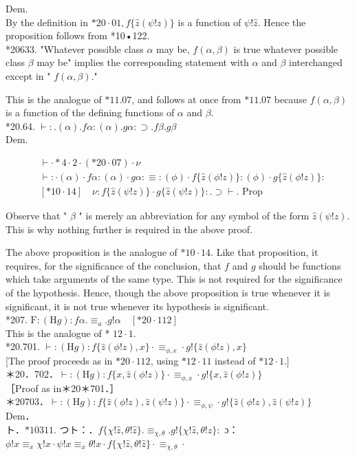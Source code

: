 \documentclass[10pt]{article}
\begin{document}
Dem.\\
By the definition in $* 20 \cdot 01, f\{\hat{z}(\psi!z)\}$ is a function of $\psi!\hat{z}$. Hence the proposition follows from *10•122.\\
*20633. "Whatever possible class $\alpha$ may be, $f(\alpha, \beta)$ is true whatever possible class $\beta$ may be" implies the corresponding statement with $\alpha$ and $\beta$ interchanged except in " $f(\alpha, \beta)$."

This is the analogue of $* 11.07$, and follows at once from $* 11.07$ because $f(\alpha, \beta)$ is a function of the defining functions of $\alpha$ and $\beta$.\\
*20.64. $\vdash: .(\alpha) . f \alpha:(\alpha) . g \alpha: \supset . f \beta . g \beta$\\
Dem.

$$
\begin{aligned}
& \vdash \cdot * 4 \cdot 2 \cdot(* 20 \cdot 07) \cdot \nu \\
& \vdash: \cdot(\alpha) \cdot f \alpha:(\alpha) \cdot g \alpha: \equiv:(\phi) \cdot f\{\hat{z}(\phi!z)\}:(\phi) \cdot g\{\hat{z}(\phi!z)\}: \\
& {[* 10 \cdot 14] \quad \nu: f\{\hat{z}(\psi!z)\} \cdot g\{\hat{z}(\psi!z)\}: . \supset \vdash . \text { Prop }}
\end{aligned}
$$

Observe that " $\beta$ " is merely an abbreviation for any symbol of the form $\hat{z}(\psi!z)$. This is why nothing further is required in the above proof.

The above proposition is the analogue of $* 10 \cdot 14$. Like that proposition, it requires, for the significance of the conclusion, that $f$ and $g$ should be functions which take arguments of the same type. This is not required for the significance of the hypothesis. Hence, though the above proposition is true whenever it is significant, it is not true whenever its hypothesis is significant.\\
*207. $\mathrm{F}:(\mathrm{H} g): f \alpha . \equiv_{a} . g!\alpha \quad[* 20 \cdot 112]$\\
This is the analogue of * $12 \cdot 1$.\\
*20.701. $\vdash:(\mathrm{H} g): f\{\hat{z}(\phi!z), x\} \cdot \equiv_{\phi, x} \cdot g!\{\hat{z}(\phi!z), x\}$\\[0pt]
[The proof proceeds as in $* 20 \cdot 112$, using $* 12 \cdot 11$ instead of $* 12 \cdot 1$.]\\
＊20．702．$\vdash:(\mathrm{H} g): f\{x, \hat{z}(\phi!z)\} \cdot \equiv_{\phi, x} \cdot g!\{x, \hat{z}(\phi!z)\}$\\
［Proof as in＊20＊701．］\\
＊20703．$\vdash:(\mathrm{H} g): f\{\hat{z}(\phi!z), \hat{z}(\psi!z)\} \cdot \equiv_{\phi, \psi} \cdot g!\{\hat{z}(\phi!z), \hat{z}(\psi!z)\}$\\
Dem．\\
ト．$* 10311$. つト：．$f\{\chi!\hat{z}, \theta!\hat{z}\} . \equiv_{\chi, \theta} . g!\{\chi!\hat{z}, \theta!\hat{z}\}:$ ɔ：\\
$\phi!x \equiv_{x} \chi!x \cdot \psi!x \equiv_{x} \theta!x \cdot f\{\chi!\hat{z}, \theta!\hat{z}\} \cdot \equiv_{\chi, \theta} \cdot$
\end{document}
